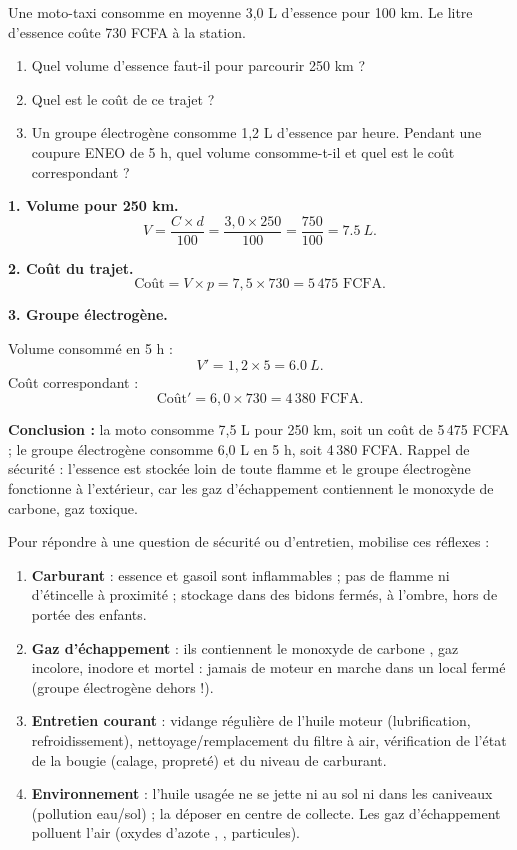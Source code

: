 \documentclass[11pt]{article}
\newcommand{\cle}[1]{{\popxbold\color{popdark}#1}}
\begin{document}
\begin{exoresolu}
Une moto-taxi consomme en moyenne 3,0 L d'essence pour 100 km. Le litre d'essence coûte 730 FCFA à la station.
\begin{enumerate}
\item Quel volume d'essence faut-il pour parcourir 250 km ?
\item Quel est le coût de ce trajet ?
\item Un groupe électrogène consomme 1,2 L d'essence par heure. Pendant une coupure ENEO de 5 h, quel volume consomme-t-il et quel est le coût correspondant ?
\end{enumerate}
\tcblower
\textbf{1. Volume pour 250 km.}
\[ V = \frac{C \times d}{100} = \frac{3,0 \times 250}{100} = \frac{750}{100} = \SI{7,5}{L}. \]

\textbf{2. Coût du trajet.}
\[ \text{Coût} = V \times p = 7,5 \times 730 = 5\,475 \text{ FCFA}. \]

\textbf{3. Groupe électrogène.}

Volume consommé en 5 h :
\[ V' = 1,2 \times 5 = \SI{6,0}{L}. \]
Coût correspondant :
\[ \text{Coût}' = 6,0 \times 730 = 4\,380 \text{ FCFA}. \]

\textbf{Conclusion :} la moto consomme 7,5 L pour 250 km, soit un coût de 5\,475 FCFA ; le groupe électrogène consomme 6,0 L en 5 h, soit 4\,380 FCFA. Rappel de sécurité : l'essence est stockée loin de toute flamme et le groupe électrogène fonctionne à l'extérieur, car les gaz d'échappement contiennent le monoxyde de carbone, gaz toxique.
\end{exoresolu}

\begin{methode}
Pour répondre à une question de sécurité ou d'entretien, mobilise ces réflexes :
\begin{enumerate}
\item \textbf{Carburant} : essence et gasoil sont inflammables ; pas de flamme ni d'étincelle à proximité ; stockage dans des bidons fermés, à l'ombre, hors de portée des enfants.
\item \textbf{Gaz d'échappement} : ils contiennent le \cle{monoxyde de carbone} , gaz incolore, inodore et mortel : jamais de moteur en marche dans un local fermé (groupe électrogène dehors !).
\item \textbf{Entretien courant} : vidange régulière de l'huile moteur (lubrification, refroidissement), nettoyage/remplacement du filtre à air, vérification de l'état de la bougie (calage, propreté) et du niveau de carburant.
\item \textbf{Environnement} : l'huile usagée ne se jette ni au sol ni dans les caniveaux (pollution eau/sol) ; la déposer en centre de collecte. Les gaz d'échappement polluent l'air (oxydes d'azote , , particules).
\end{enumerate}
\end{methode}
\end{document}

